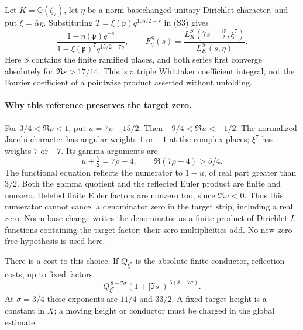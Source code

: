 \documentclass[11pt]{article}
\begin{document}
Let \(K=\mathbb Q(\zeta_7)\), let \(\eta\) be a norm-basechanged
unitary Dirichlet character, and put \(\xi=\bar\alpha\eta\).
Substituting \(T=\xi(\mathfrak p)q^{105/2-s}\) in (S3) gives
\[
 \frac{1-\eta(\mathfrak p)q^{-s}}
      {1-\xi(\mathfrak p)^7q^{15/2-7s}},\qquad
 F_\eta^S(s)=
 \frac{L_K^S(7s-\tfrac{15}{2},\xi^7)}{L_K^S(s,\eta)}.
 \tag{S4}\label{eq:septic-ray-euler}
\]
Here \(S\) contains the finite ramified places, and both series first
converge absolutely for \(\Re s>17/14\).
This is a triple Whittaker coefficient integral, not the Fourier
coefficient of a pointwise product asserted without unfolding.

\paragraph{Why this reference preserves the target zero.}
For \(3/4<\Re\rho<1\), put \(u=7\rho-15/2\).
Then \(-9/4<\Re u<-1/2\).
The normalized Jacobi character has angular weights \(1\) or \(-1\)
at the complex places; \(\xi^7\) has weights \(7\) or \(-7\).
Its gamma arguments are
\[
 u+\tfrac72=7\rho-4,\qquad \Re(7\rho-4)>5/4.
\]
The functional equation reflects the numerator to \(1-u\), of real
part greater than \(3/2\). Both the gamma quotient and the reflected
Euler product are finite and nonzero. Deleted finite Euler factors
are nonzero too, since \(\Re u<0\).
Thus this numerator cannot cancel a denominator zero in the target
strip, including a real zero. Norm base change writes the denominator
as a finite product of Dirichlet \(L\)-functions containing the target
factor; their zero multiplicities add. No new zero-free hypothesis
is used here.

There is a cost to this choice. If \(Q_{\xi^7}\) is the absolute
finite conductor, reflection costs, up to fixed factors,
\[
 Q_{\xi^7}^{\,8-7\sigma}
 (1+|\Im s|)^{\,6(8-7\sigma)}.
 \tag{S5}\label{eq:septic-ray-height}
\]
At \(\sigma=3/4\) these exponents are \(11/4\) and \(33/2\).
A fixed target height is a constant in \(X\); a moving height or
conductor must be charged in the global estimate.
\end{document}

